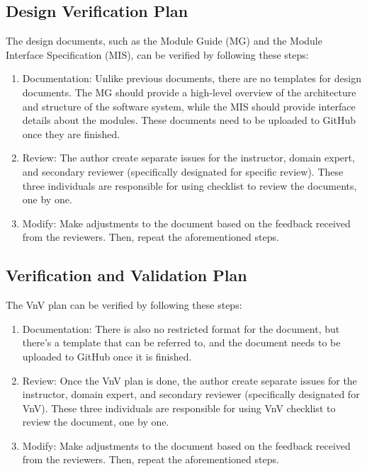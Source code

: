 \documentclass[12pt, titlepage]{article}
\begin{document}
\subsection{Design Verification Plan}
The design documents, such as the Module Guide (MG) and the Module Interface Specification (MIS), can be verified by following these steps:
\begin{enumerate}
    \item Documentation: Unlike previous documents, there are no templates for design documents. The MG should provide a high-level overview of the architecture and structure of the software system, while the MIS should provide interface details about the modules. These documents need to be uploaded to GitHub once they are finished.
    \item Review: The author create separate issues for the instructor, domain expert, and secondary reviewer (specifically designated for specific review). These three individuals are responsible for using checklist \cite{mgcheck} \cite{mischeck} to review the documents, one by one.
    \item Modify: Make adjustments to the document based on the feedback received from the reviewers. Then, repeat the aforementioned steps.
\end{enumerate}

\subsection{Verification and Validation Plan}

The VnV plan can be verified by following these steps:

\begin{enumerate}
    \item Documentation: There is also no restricted format for the document, but there's a template \cite{vnvtem} that can be referred to, and the document needs to be uploaded to GitHub once it is finished.
    \item Review: Once the VnV plan is done, the author create separate issues for the instructor, domain expert, and secondary reviewer (specifically designated for VnV). These three individuals are responsible for using VnV checklist \cite{vnvcheck}to review the document, one by one.
    \item Modify: Make adjustments to the document based on the feedback received from the reviewers. Then, repeat the aforementioned steps.
\end{enumerate}
\end{document}
